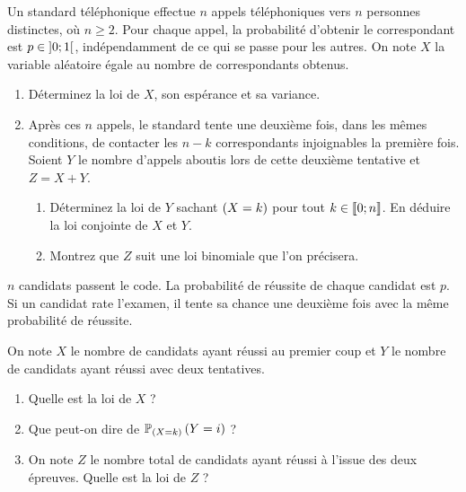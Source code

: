 \begin{exoss}
Un standard téléphonique effectue \(n\) appels téléphoniques vers \(n\) personnes distinctes, où \(n\geq2\). Pour chaque appel, la probabilité d'obtenir le correspondant est \(p\in\intervee{0}{1}\), indépendamment de ce qui se passe pour les autres. On note \(X\) la variable aléatoire égale au nombre de correspondants obtenus.

\begin{enumerate}
    \item Déterminez la loi de \(X\), son espérance et sa variance. \\
    \item Après ces \(n\) appels, le standard tente une deuxième fois, dans les mêmes conditions, de contacter les \(n-k\) correspondants injoignables la première fois. Soient \(Y\) le nombre d'appels aboutis lors de cette deuxième tentative et \(Z=X+Y\). \\ \begin{enumerate}
        \item Déterminez la loi de \(Y\) sachant \(\paren{X=k}\) pour tout \(k\in\interventierii{0}{n}\). En déduire la loi conjointe de \(X\) et \(Y\). \\
        \item Montrez que \(Z\) suit une loi binomiale que l'on précisera.
    \end{enumerate}
\end{enumerate}
\end{exoss}

\begin{exoss}
\(n\) candidats passent le code. La probabilité de réussite de chaque candidat est \(p\). Si un candidat rate l'examen, il tente sa chance une deuxième fois avec la même probabilité de réussite.

On note \(X\) le nombre de candidats ayant réussi au premier coup et \(Y\) le nombre de candidats ayant réussi avec deux tentatives.

\begin{enumerate}
    \item Quelle est la loi de \(X\) ? \\
    \item Que peut-on dire de \(\probacond{Y=i}{\paren{X=k}}\) ? \\
    \item On note \(Z\) le nombre total de candidats ayant réussi à l'issue des deux épreuves. Quelle est la loi de \(Z\) ?
\end{enumerate}
\end{exoss}

